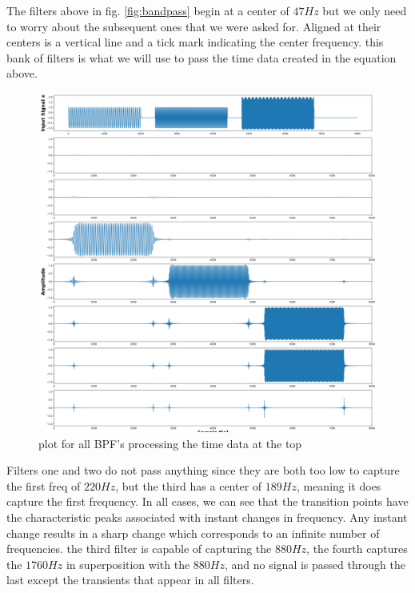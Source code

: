 \documentclass[a4paper, 11pt]{exam}
\begin{document}
\newline
The filters above in fig. \ref{fig:bandpass} begin at a center of $47Hz$ but we only need to worry about the subsequent ones that we were asked for. Aligned at their centers is a vertical line and a tick mark indicating the center frequency. this bank of filters is what we will use to pass the time data created in the equation above. 
\newpage
\begin{figure}[h!]
  \centering
  \hspace*{-1.5cm}\includegraphics[width=17cm]{../time_data.png}
  \caption{plot for all BPF's processing the time data at the top}
  \label{fig:time_data}
\end{figure}
Filters one and two do not pass anything since they are both too low to capture the first freq of $220Hz$, but the third has a center of $189Hz$, meaning it does capture the first frequency. In all cases, we can see that the transition points have the characteristic peaks associated with instant changes in frequency. Any instant change results in a sharp change which corresponds to an infinite number of frequencies. the third filter is capable of capturing the $880Hz$, the fourth captures the $1760Hz$ in superposition with the $880Hz$, and no signal is passed through the last except the transients that appear in all filters.
\newpage
\end{document}
